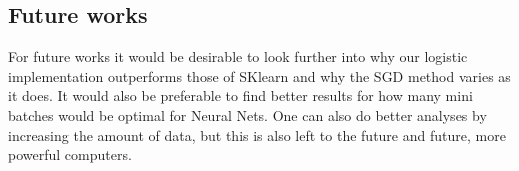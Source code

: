 \documentclass[11pt]{article}
\begin{document}
\subsection{Future works}
For future works it would be desirable to look further into why our logistic implementation outperforms those of SKlearn and why the SGD method varies as it does. It would also be preferable to find better results for how many mini batches would be optimal for Neural Nets. One can also do better analyses by increasing the amount of data, but this is also left to the future and future, more powerful computers.
\end{document}
